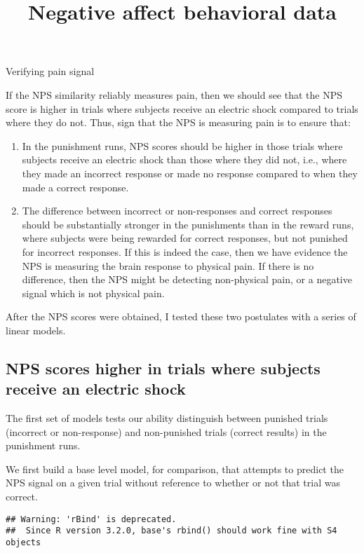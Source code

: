 \documentclass[]{article}
\title{Negative affect behavioral data}
\author{}
\date{}
\providecommand{\tightlist}{%
  \setlength{\itemsep}{0pt}\setlength{\parskip}{0pt}}
\begin{document}
\maketitle

Verifying pain signal

If the NPS similarity reliably measures pain, then we should see that
the NPS score is higher in trials where subjects receive an electric
shock compared to trials where they do not. Thus, sign that the NPS is
measuring pain is to ensure that:

\begin{enumerate}
\def\labelenumi{\arabic{enumi}.}
\tightlist
\item
  In the punishment runs, NPS scores should be higher in those trials
  where subjects receive an electric shock than those where they did
  not, i.e., where they made an incorrect response or made no response
  compared to when they made a correct response.
\item
  The difference between incorrect or non-responses and correct
  responses should be substantially stronger in the punishments than in
  the reward runs, where subjects were being rewarded for correct
  responses, but not punished for incorrect responses. If this is indeed
  the case, then we have evidence the NPS is measuring the brain
  response to physical pain. If there is no difference, then the NPS
  might be detecting non-physical pain, or a negative signal which is
  not physical pain.
\end{enumerate}

After the NPS scores were obtained, I tested these two postulates with a
series of linear models.

\subsection{NPS scores higher in trials where subjects receive an
electric
shock}\label{nps-scores-higher-in-trials-where-subjects-receive-an-electric-shock}

The first set of models tests our ability distinguish between punished
trials (incorrect or non-response) and non-punished trials (correct
results) in the punishment runs.

We first build a base level model, for comparison, that attempts to
predict the NPS signal on a given trial without reference to whether or
not that trial was correct.

\begin{verbatim}
## Warning: 'rBind' is deprecated.
##  Since R version 3.2.0, base's rbind() should work fine with S4 objects
\end{verbatim}
\end{document}
